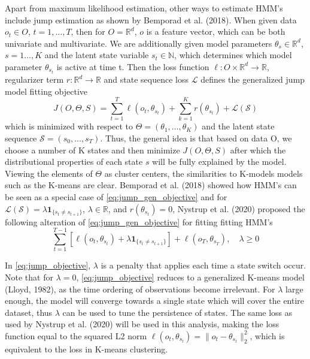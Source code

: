 Apart from maximum likelihood estimation, other ways to estimate HMM's include jump estimation as shown by Bemporad et al. (2018). When given data $o_t\in O$, $t=1,\ldots,T$, then for $O = \mathbb{R}^d$, $o$ is a feature vector, which can be both univariate and multivariate. We are additionally given model parameters $\theta_s\in \mathbb{R}^d$, $s=1...,K$ and the latent state variable $s_t\in\mathbb{N}$, which determines which model parameter $\theta_{s_t}$ is active at time t. Then the loss function $\ell: O\times\mathbb{R}^d \rightarrow\mathbb{R}$, regularizer term $r: \mathbb{R}^d \rightarrow \mathbb{R}$ and state sequence loss $\mathcal{L}$ defines the generalized jump model fitting objective
\begin{equation}
    J(O, \Theta, S) = \sum_{t=1}^T \ell(o_t,\theta_{s_t}) + \sum_{k=1}^K r(\theta_{s_t}) + \mathcal{L(S)}
\label{eq:jump_gen_objective}    
\end{equation}
which is minimized with respect to $\Theta=(\theta_1,\ldots,\theta_K)$ and the latent state sequence $\mathcal{S}=(s_0,\ldots,s_T)$. Thus, the general idea is that based on data O, we choose a number of K states and then minimize $J(O, \Theta, S)$ after which the distributional properties of each state $s$ will be fully explained by the model. Viewing the elements of $\Theta$ as cluster centers, the similarities to K-models models such as the K-means are clear. Bemporad et al. (2018) showed how HMM's can be seen as a special case of \cref{eq:jump_gen_objective} and for $\mathcal{L(S)} = \lambda\mathbf{1}_{\{ s_t\ne s_{t+1}\}}$, $\lambda \in \mathbb{R}$, and $r(\theta_{s_t})=0$, Nystrup et al. (2020) proposed the following alteration of \cref{eq:jump_gen_objective} for fitting fitting HMM's
\begin{equation}
    \sum_{t=1}^{T-1}[\ell(o_t, \theta_{s_t}) + \lambda\mathbf{1}_{\{ s_t\ne s_{t+1} \}}]
    + \ell(o_T, \theta_{s_T})
    ,\quad \lambda \geq 0
\label{eq:jump_objective}
\end{equation}

In \cref{eq:jump_objective}, $\lambda$ is a penalty that applies each time a state switch occur. Note that for $\lambda=0$, \cref{eq:jump_objective} reduces to a generalized K-means model (Lloyd, 1982), as the time ordering of observations become irrelevant. For $\lambda$ large enough, the model will converge towards a single state which will cover the entire dataset, thus $\lambda$ can be used to tune the persistence of states. The same loss as used by Nystrup et al. (2020) will be used in this analysis, making the loss function equal to the squared L2 norm $\ell(o_t, \theta_{s_t}) = \| o_t - \theta_{s_t} \|_2^2$, which is equivalent to the loss in K-means clustering.

